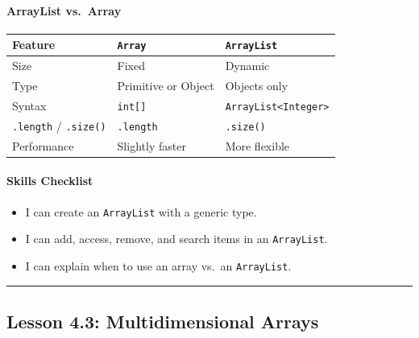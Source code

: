 \documentclass[
  justified,
  openright,
]{tufte-book}
\let\subsubsection\paragraph
\let\paragraph\paragraph
\let\subsubsection\paragraph
\let\paragraph\paragraph
\providecommand{\tightlist}{%
  \setlength{\itemsep}{0pt}\setlength{\parskip}{0pt}}
\begin{document}
\subsubsection{ArrayList vs.~Array}\label{arraylist-vs.-array}

{\def\LTcaptype{none} %
\begin{longtable}[]{@{}lll@{}}
\toprule\noalign{}
Feature & \texttt{Array} & \texttt{ArrayList} \\
\midrule\noalign{}
\endhead
\bottomrule\noalign{}
\endlastfoot
Size & Fixed & Dynamic \\
Type & Primitive or Object & Objects only \\
Syntax & \texttt{int{[}{]}} &
\texttt{ArrayList\textless{}Integer\textgreater{}} \\
\texttt{.length} / \texttt{.size()} & \texttt{.length} &
\texttt{.size()} \\
Performance & Slightly faster & More flexible \\
\end{longtable}
}

\subsubsection{Skills Checklist}\label{skills-checklist-11}

\begin{itemize}
\tightlist
\item[$\square$]
  I can create an \texttt{ArrayList} with a generic type.
\item[$\square$]
  I can add, access, remove, and search items in an \texttt{ArrayList}.
\item[$\square$]
  I can explain when to use an array vs.~an \texttt{ArrayList}.
\end{itemize}

\begin{center}\rule{0.5\linewidth}{0.5pt}\end{center}

\subsection{Lesson 4.3: Multidimensional
Arrays}\label{lesson-4.3-multidimensional-arrays}
\end{document}

